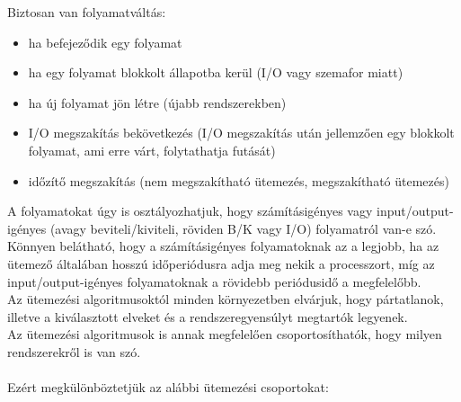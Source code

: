 \documentclass[tikz,12pt,margin=0px]{article}
\begin{document}
    \noindent Biztosan van folyamatváltás:
    \begin{itemize}[topsep=8pt,itemsep=4pt,partopsep=4pt, parsep=4pt]
        \item ha befejeződik egy folyamat
        \item ha egy folyamat blokkolt állapotba kerül (I/O vagy szemafor miatt)
        \item ha új folyamat jön létre (újabb rendszerekben)
        \item I/O megszakítás bekövetkezés (I/O megszakítás után jellemzően egy blokkolt folyamat, ami erre várt, folytathatja futását)
        \item időzítő megszakítás (nem megszakítható ütemezés, megszakítható ütemezés) \\
    \end{itemize}

    \noindent A folyamatokat úgy is osztályozhatjuk, hogy számításigényes vagy input/output-igényes (avagy beviteli/kiviteli, röviden B/K vagy I/O) folyamatról van-e szó. Könnyen belátható, hogy a számításigényes folyamatoknak az a legjobb, ha az ütemező általában hosszú időperiódusra adja meg nekik a processzort, míg az input/output-igényes folyamatoknak a rövidebb periódusidő a megfelelőbb.\\

    \noindent Az ütemezési algoritmusoktól minden környezetben elvárjuk, hogy pártatlanok, illetve a kiválasztott elveket és a rendszeregyensúlyt megtartók legyenek.\\

    \noindent Az ütemezési algoritmusok is annak megfelelően csoportosíthatók, hogy milyen rendszerekről is van szó.\\\\
\newpage
    \noindent Ezért megkülönböztetjük az alábbi ütemezési csoportokat:
\end{document}
